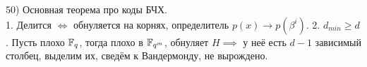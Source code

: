 50) Основная теорема про коды БЧХ.\\
1. Делится $\Leftrightarrow$ обнуляется на корнях, определитель $p(x) \rightarrow p(\beta^i)$. 2. $d_{min} \ge d$. Пусть плохо $\mathbb{F}_q$, тогда плохо в $\mathbb{F}_{q^m}$, обнуляет $H \implies$ у неё есть $d-1$ зависимый столбец, выделим их, сведём к Вандермонду, не вырождено. \\
